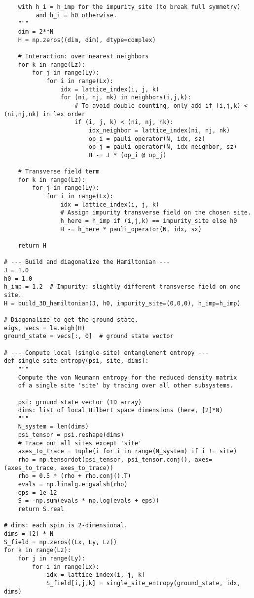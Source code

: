 \documentclass[12pt]{article}
\begin{document}
\begin{verbatim}
    with h_i = h_imp for the impurity_site (to break full symmetry)
         and h_i = h0 otherwise.
    """
    dim = 2**N
    H = np.zeros((dim, dim), dtype=complex)
    
    # Interaction: over nearest neighbors
    for k in range(Lz):
        for j in range(Ly):
            for i in range(Lx):
                idx = lattice_index(i, j, k)
                for (ni, nj, nk) in neighbors(i,j,k):
                    # To avoid double counting, only add if (i,j,k) < (ni,nj,nk) in lex order
                    if (i, j, k) < (ni, nj, nk):
                        idx_neighbor = lattice_index(ni, nj, nk)
                        op_i = pauli_operator(N, idx, sz)
                        op_j = pauli_operator(N, idx_neighbor, sz)
                        H -= J * (op_i @ op_j)
    
    # Transverse field term
    for k in range(Lz):
        for j in range(Ly):
            for i in range(Lx):
                idx = lattice_index(i, j, k)
                # Assign impurity transverse field on the chosen site.
                h_here = h_imp if (i,j,k) == impurity_site else h0
                H -= h_here * pauli_operator(N, idx, sx)
    
    return H

# --- Build and diagonalize the Hamiltonian ---
J = 1.0
h0 = 1.0
h_imp = 1.2  # Impurity: slightly different transverse field on one site.
H = build_3D_hamiltonian(J, h0, impurity_site=(0,0,0), h_imp=h_imp)

# Diagonalize to get the ground state.
eigs, vecs = la.eigh(H)
ground_state = vecs[:, 0]  # ground state vector

# --- Compute local (single-site) entanglement entropy ---
def single_site_entropy(psi, site, dims):
    """
    Compute the von Neumann entropy for the reduced density matrix
    of a single site 'site' by tracing over all other subsystems.
    
    psi: ground state vector (1D array)
    dims: list of local Hilbert space dimensions (here, [2]*N)
    """
    N_system = len(dims)
    psi_tensor = psi.reshape(dims)
    # Trace out all sites except 'site'
    axes_to_trace = tuple(i for i in range(N_system) if i != site)
    rho = np.tensordot(psi_tensor, psi_tensor.conj(), axes=(axes_to_trace, axes_to_trace))
    rho = 0.5 * (rho + rho.conj().T)
    evals = np.linalg.eigvalsh(rho)
    eps = 1e-12
    S = -np.sum(evals * np.log(evals + eps))
    return S.real

# dims: each spin is 2-dimensional.
dims = [2] * N
S_field = np.zeros((Lx, Ly, Lz))
for k in range(Lz):
    for j in range(Ly):
        for i in range(Lx):
            idx = lattice_index(i, j, k)
            S_field[i,j,k] = single_site_entropy(ground_state, idx, dims)


\end{verbatim}
\end{document}
